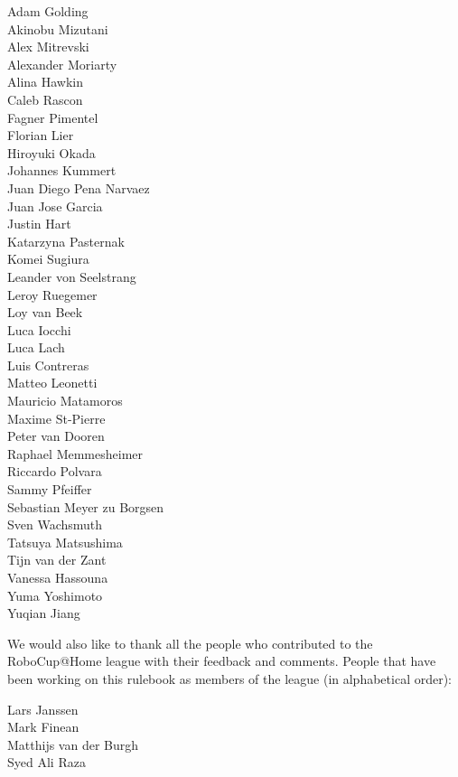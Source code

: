 \begin{center}
	\begin{minipage}{0.8\textwidth}
		\begin{multicols}{3}%
			\footnotesize
			\noindent%
			Adam Golding\\
			Akinobu Mizutani\\
			Alex Mitrevski\\
			Alexander Moriarty\\
			Alina Hawkin\\
			Caleb Rascon\\
			Fagner Pimentel\\
			Florian Lier\\
			Hiroyuki Okada\\
			Johannes Kummert\\
			Juan Diego Pena Narvaez\\
			Juan Jose Garcia\\
			Justin Hart\\
			Katarzyna Pasternak\\
			Komei Sugiura\\
			Leander von Seelstrang\\
			Leroy Ruegemer\\
			Loy van Beek\\
			Luca Iocchi\\
			Luca Lach\\
			Luis Contreras\\
			Matteo Leonetti\\
			Mauricio Matamoros\\
			Maxime St-Pierre\\
			Peter van Dooren\\
			Raphael Memmesheimer\\
			Riccardo Polvara\\
			Sammy Pfeiffer\\
			Sebastian Meyer zu Borgsen\\
			Sven Wachsmuth\\
			Tatsuya Matsushima\\
			Tijn van der Zant\\
			Vanessa Hassouna\\
			Yuma Yoshimoto\\
			Yuqian Jiang
		\end{multicols}
	\end{minipage}
\end{center}

\noindent We would also like to thank all the people who contributed to the RoboCup@Home league with their feedback and comments.
People that have been working on this rulebook as members of the league (in alphabetical order):
\begin{center}
	\begin{minipage}{0.8\textwidth}
		\begin{multicols}{2}%
			\footnotesize
			\noindent%
			Lars Janssen\\
			Mark Finean\\
			Matthijs van der Burgh\\
			Syed Ali Raza\\
		\end{multicols}
	\end{minipage}
\end{center}

